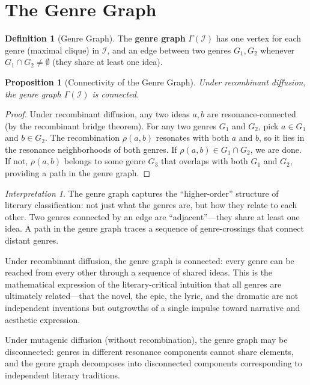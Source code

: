 \documentclass[11pt,openany]{book}
\theoremstyle{definition}
\newtheorem{definition}[axiom]{Definition}
\theoremstyle{plain}
\newtheorem{proposition}[axiom]{Proposition}
\theoremstyle{remark}
\newtheorem{interpretation}[axiom]{Interpretation}
\newcommand{\IS}{\mathcal{I}}               %
\begin{document}
\section{The Genre Graph}

\begin{definition}[Genre Graph]
The \textbf{genre graph} $\Gamma(\IS)$ has one vertex for each genre (maximal clique) in $\IS$, and an edge between two genres $G_1, G_2$ whenever $G_1 \cap G_2 \neq \emptyset$ (they share at least one idea).
\end{definition}

\begin{proposition}[Connectivity of the Genre Graph]
Under recombinant diffusion, the genre graph $\Gamma(\IS)$ is connected.
\end{proposition}

\begin{proof}
Under recombinant diffusion, any two ideas $a, b$ are resonance-connected (by the recombinant bridge theorem). For any two genres $G_1$ and $G_2$, pick $a \in G_1$ and $b \in G_2$. The recombination $\rho(a, b)$ resonates with both $a$ and $b$, so it lies in the resonance neighborhoods of both genres. If $\rho(a, b) \in G_1 \cap G_2$, we are done. If not, $\rho(a, b)$ belongs to some genre $G_3$ that overlaps with both $G_1$ and $G_2$, providing a path in the genre graph.
\end{proof}

\begin{interpretation}
The genre graph captures the ``higher-order'' structure of literary classification: not just what the genres are, but how they relate to each other. Two genres connected by an edge are ``adjacent''---they share at least one idea. A path in the genre graph traces a sequence of genre-crossings that connect distant genres.

Under recombinant diffusion, the genre graph is connected: every genre can be reached from every other through a sequence of shared ideas. This is the mathematical expression of the literary-critical intuition that all genres are ultimately related---that the novel, the epic, the lyric, and the dramatic are not independent inventions but outgrowths of a single impulse toward narrative and aesthetic expression.

Under mutagenic diffusion (without recombination), the genre graph may be disconnected: genres in different resonance components cannot share elements, and the genre graph decomposes into disconnected components corresponding to independent literary traditions.
\end{interpretation}
\end{document}
